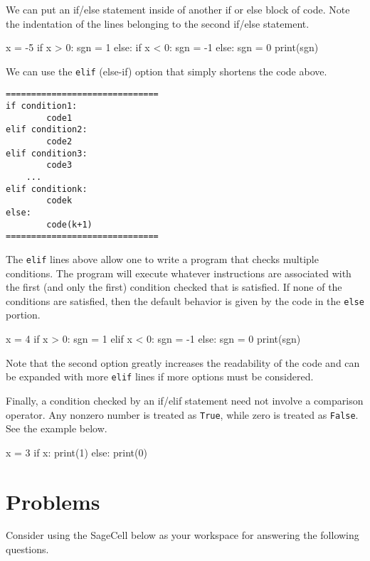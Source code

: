 \documentclass{ximera}
\begin{document}
We can put an if/else statement inside of another if or else block of code. Note the indentation of the lines belonging to the second if/else statement.

\begin{sageCell}
x = -5
if x > 0:
	sgn = 1
else:
	if x < 0:
		sgn = -1
	else:
		sgn = 0
print(sgn)
\end{sageCell}
	
We can use the \verb|elif| (else-if) option that simply shortens the code above.

\begin{verbatim}
==============================
if condition1:
        code1
elif condition2:
        code2
elif condition3:
        code3
    ...
elif conditionk:
        codek
else:
        code(k+1)
==============================
\end{verbatim}

The \verb|elif| lines above allow one to write a program that checks multiple conditions. The program will execute whatever instructions are associated with the first (and only the first) condition checked that is satisfied. If none of the conditions are satisfied, then the default behavior is given by the code in the \verb|else| portion.

\begin{sageCell}
x = 4
if x > 0:
        sgn = 1
elif x < 0:
        sgn = -1
else:
        sgn = 0
print(sgn)
\end{sageCell}

Note that the second option greatly increases the readability of the code and can be expanded with more \verb|elif| lines if more options must be considered.

Finally, a condition checked by an if/elif statement need not involve a comparison operator. Any nonzero number is treated as \verb|True|, while zero is treated as \verb|False|. See the example below.

\begin{sageCell}
x = 3
if x:
       print(1)
else:
       print(0)
\end{sageCell}

\section{Problems}

Consider using the SageCell below as your workspace for answering the following questions.
\end{document}
